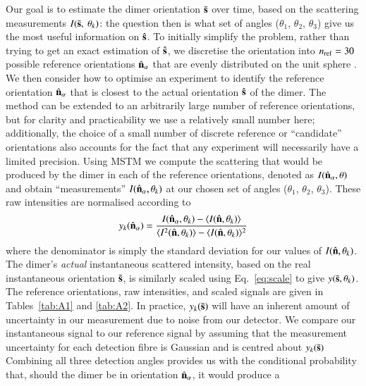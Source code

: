 \documentclass[final, 3p]{elsarticle}
\begin{document}
Our goal is to estimate the dimer orientation $\bar{\bf s}$ over time,
based on the scattering measurements $I(\bar{\bf s},\ \theta_k)$: the
question then is what set of angles ($\theta_1$, $\theta_2$,
$\theta_3$) give us the most useful information on $\hat{\bf s}$.  To
initially simplify the problem, rather than trying to get an exact
estimation of $\hat{\bf s}$, we discretise the orientation into
$n_{\rm ref}=30$ possible reference orientations $\hat{\bf n}_\alpha$
that are evenly distributed on the unit sphere \cite{Rey2006}.
%
We then consider how to optimise an experiment to identify the
reference orientation $\hat{\bf n}_\alpha$ that is closest to the
actual orientation $\hat{\bf s}$ of the dimer.
%
The method can be extended to an arbitrarily large number of reference
orientations, but for clarity and practicability we use a relatively
small number here; additionally, the choice of a small number of
discrete reference or ``candidate'' orientations also accounts for the
fact that any experiment will necessarily have a limited precision.
%
Using MSTM we compute the scattering that would be produced by the
dimer in each of the reference orientations, denoted as
$I(\hat{\bf n}_\alpha, \theta)$ and obtain ``measurements''
$I(\hat{\bf n}_\alpha, \theta_k)$ at our chosen set of angles
($\theta_1$, $\theta_2$, $\theta_3$).
%
These raw intensities are normalised according to
\begin{align}
\label{eq:scale}
  y_k(\hat{\bf n}_\alpha)
  = 
  \frac{I(\hat{\bf n}_\alpha, \theta_k) - \langle I(\hat{\bf n},\theta_k) \rangle } 
  {\langle I^2(\hat{\bf n},\theta_k) \rangle -\langle I(\hat{\bf n}, \theta_k)\rangle^2}
\end{align}
where the denominator is simply the standard deviation for our values
of $I(\hat{\bf n}, \theta_k)$.  The dimer's \emph{actual}
instantaneous scattered intensity, based on the real instantaneous
orientation $\bar{\bf s}$, is similarly scaled using
Eq.~\eqref{eq:scale} to give $y(\bar{\bf s},\theta_k)$.
%
The reference orientations, raw intensities, and scaled signals are
given in Tables~\ref{tab:A1} and \ref{tab:A2}.
%
In practice, $y_k(\bar{\bf s})$ will have an inherent amount of
uncertainty in our measurement due to noise from our detector.  We
compare our instantaneous signal to our reference signal by assuming
that the measurement uncertainty for each detection fibre is Gaussian
and is centred about $y_k(\bar{\bf s})$ Combining all three detection
angles provides us with the conditional probability that, should the
dimer be in orientation $\hat{\bf n}_\alpha$, it would produce a
\end{document}
